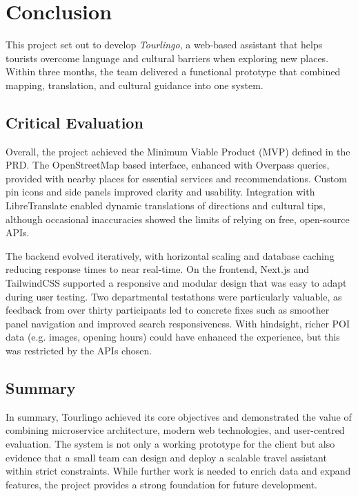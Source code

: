 \chapter{Conclusion}

This project set out to develop \textit{Tourlingo}, a web-based assistant that helps tourists overcome language and cultural barriers when exploring new places. Within three months, the team delivered a functional prototype that combined mapping, translation, and cultural guidance into one system.

\section{Critical Evaluation}
Overall, the project achieved the Minimum Viable Product (MVP) defined in the PRD. The OpenStreetMap based interface, enhanced with Overpass queries, provided with nearby places for essential services and recommendations. Custom pin icons and side panels improved clarity and usability. Integration with LibreTranslate enabled dynamic translations of directions and cultural tips, although occasional inaccuracies showed the limits of relying on free, open-source APIs.  

The backend evolved iteratively, with horizontal scaling and database caching reducing response times to near real-time. On the frontend, Next.js and TailwindCSS supported a responsive and modular design that was easy to adapt during user testing. Two departmental testathons were particularly valuable, as feedback from over thirty participants led to concrete fixes such as smoother panel navigation and improved search responsiveness. With hindsight, richer POI data (e.g. images, opening hours) could have enhanced the experience, but this was restricted by the APIs chosen.

\section{Summary}
In summary, Tourlingo achieved its core objectives and demonstrated the value of combining microservice architecture, modern web technologies, and user-centred evaluation. The system is not only a working prototype for the client but also evidence that a small team can design and deploy a scalable travel assistant within strict constraints. While further work is needed to enrich data and expand features, the project provides a strong foundation for future development.
